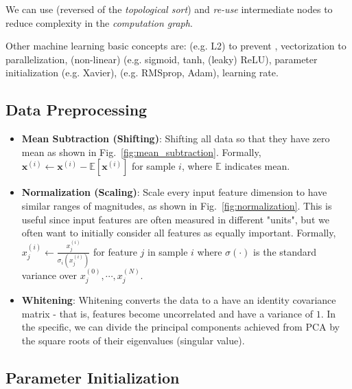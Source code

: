We can use  (reversed of the \emph{topological sort}) and \emph{re-use} intermediate nodes to reduce complexity in the \emph{computation graph}.

Other machine learning basic concepts are:  (e.g. L2) to prevent , vectorization to parallelization, (non-linear)  (e.g. sigmoid, tanh, (leaky) ReLU), parameter initialization (e.g. Xavier),  (e.g. RMSprop, Adam), learning rate.


\subsection{Data Preprocessing}

\begin{itemize}
	\item \textbf{Mean Subtraction (Shifting)}: Shifting all data so that they have zero mean as shown in Fig.~\ref{fig:mean_subtraction}. Formally, $\bm{x}^{(i)} \leftarrow \bm{x}^{(i)} - \mathbb{E}[\bm{x}^{(i)}]$ for sample $i$, where $\mathbb{E}$ indicates mean.
	\item \textbf{Normalization (Scaling)}: Scale every input feature dimension to have
	similar ranges of magnitudes, as shown in Fig.~\ref{fig:normalization}. This is useful since input features are often measured in different "units", but we often want to initially consider all features as equally important. Formally, $x^{(i)}_{j} \leftarrow \frac{x^{(i)}_{j}}{\sigma_i (x^{(i)}_{j})}$ for feature $j$ in sample $i$ where $\sigma(\cdot)$ is the standard variance over $x^{(0)}_{j}, \cdots, x^{(N)}_{j}$.
	\item \textbf{Whitening}: Whitening converts the data to a have an identity covariance matrix - that is, features become uncorrelated and have a variance of $1$. In the specific, we can divide the principal components achieved from PCA by the square roots of their eigenvalues (singular value).
\end{itemize}

\subsection{Parameter Initialization}
	
